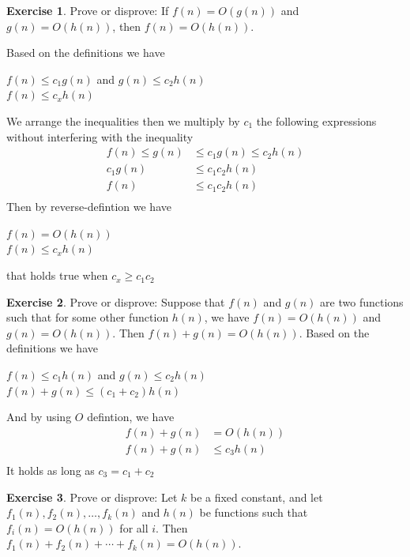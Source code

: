 \documentclass{article}
\theoremstyle{definition}
\newtheorem{exercise}{Exercise}[section]
\begin{document}
\begin{exercise}
    Prove or disprove: If $f(n) = O(g(n))$ and $g(n) = O(h(n))$, then $f(n) = O(h(n))$.

    Based on the definitions we have
    \begin{center}
        $f(n)\leqslant c_1g(n)$ and $g(n)\leqslant c_2h(n)$\\
        $f(n)\leqslant c_xh(n)$        
    \end{center}
    We arrange the inequalities then we multiply by $c_1$ the following expressions without interfering with the inequality
    \begin{align*}
        f(n) \leqslant g(n) &\leqslant c_1g(n) \leqslant c_2h(n)\\
        c_1g(n) &\leqslant c_1c_2h(n)\\
        f(n) &\leqslant c_1c_2h(n)\\
    \end{align*}
    Then by reverse-defintion we have
    \begin{center}
        $f(n)=O(h(n))$\\
        $f(n) \leqslant c_xh(n)$
    \end{center}
    that holds true when  $c_x \geqslant c_1c_2$
\end{exercise}

\begin{exercise}
    Prove or disprove: Suppose that $f(n)$ and $g(n)$ are two functions such that for some other function $h(n)$, we have $f(n) = O(h(n))$ and $g(n) = O(h(n))$. Then $f(n) + g(n) = O(h(n))$.
    Based on the definitions we have
    \begin{center}
        $f(n)\leqslant c_1h(n)$ and $g(n)\leqslant c_2h(n)$\\
        $f(n)+g(n) \leqslant (c_1+c_2)h(n)$
    \end{center}
    And by using $O$ defintion, we have
    \begin{align*}
        f(n)+g(n) &= O(h(n))\\
        f(n)+g(n) &\leqslant c_3h(n)\\
    \end{align*}
    It holds as long as $c_3=c_1+c_2$
\end{exercise}

\begin{exercise}
    Prove or disprove: Let $k$ be a fixed constant, and let $f_1(n), f_2(n), \ldots, f_k(n)$ and $h(n)$ be functions such that $f_i(n) = O(h(n))$ for all $i$. Then $f_1(n) + f_2(n) + \cdots + f_k(n) = O(h(n))$.
\end{exercise}
\end{document}

